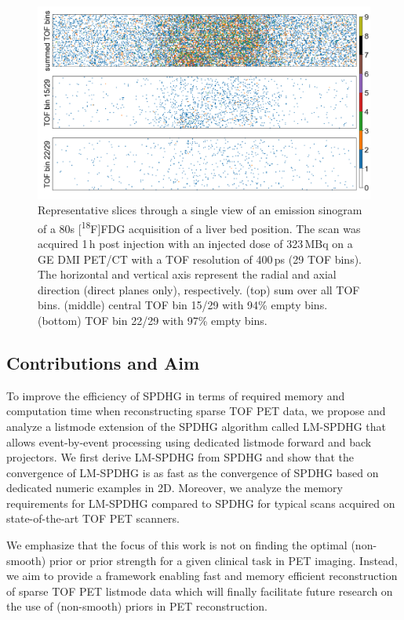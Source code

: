 \begin{figure}
  \centering
    \includegraphics[width=0.7\columnwidth]{./figure1_sparsity.png}
  \caption{Representative slices through a single view of an emission sinogram of a 
  80s [\textsuperscript{18}F]FDG acquisition of a liver bed position. 
  The scan was acquired 1\,h post injection with an injected dose of 323\,MBq on
  a GE DMI PET/CT with a TOF resolution of 400\,ps (29 TOF bins). 
  The horizontal and vertical axis represent the radial and axial direction (direct planes only), 
  respectively. 
  (top) sum over all TOF bins. (middle) central TOF bin 15/29 with 94\% empty bins. 
  (bottom) TOF bin 22/29 with 97\% empty bins.}

  \label{fig:sparsity}
\end{figure}


\subsection*{Contributions and Aim}

To improve the efficiency of SPDHG in terms of required memory and computation time when reconstructing 
sparse TOF PET data, we propose and analyze a listmode extension of the SPDHG algorithm  called
LM-SPDHG that allows event-by-event processing using dedicated listmode forward and back projectors.
We first derive LM-SPDHG from SPDHG and show that the convergence of LM-SPDHG is as 
fast as the convergence of SPDHG based on dedicated numeric examples in 2D.
Moreover, we analyze the memory requirements for LM-SPDHG compared to SPDHG for typical scans 
acquired on state-of-the-art TOF PET scanners.

We emphasize that the focus of this work is not on finding the
optimal (non-smooth) prior or prior strength for a given clinical task in PET imaging.
Instead, we aim to provide a framework enabling fast and memory efficient reconstruction of 
sparse TOF PET listmode data which will finally facilitate future research on the use of
(non-smooth) priors in PET reconstruction. 


